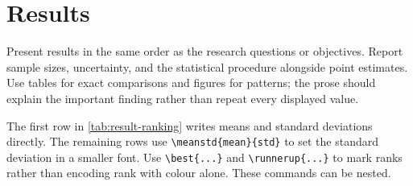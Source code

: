 \section{Results}
\label{sec:study-one-results}

Present results in the same order as the research questions or objectives. Report
sample sizes, uncertainty, and the statistical procedure alongside point estimates.
Use tables for exact comparisons and figures for patterns; the prose should explain
the important finding rather than repeat every displayed value.



The first row in \cref{tab:result-ranking} writes means and standard deviations
directly. The remaining rows use \verb|\meanstd{mean}{std}| to set the standard
deviation in a smaller font. Use \verb|\best{...}| and \verb|\runnerup{...}| to
mark ranks rather than encoding rank with colour alone. These commands can be
nested.
